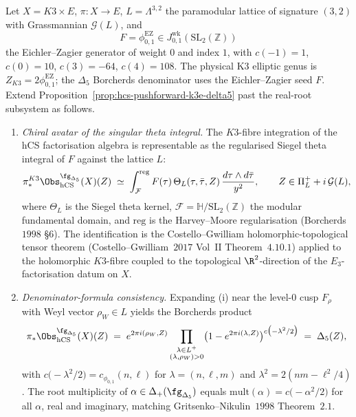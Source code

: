 \begin{theorem}
\label{thm:hcs-pushforward-imaginary-roots-singular-theta}
Let $X = K3 \times E$, $\pi \colon X \to E$, \(L=\Lambda^{3,2}\) the
paramodular lattice of signature \((3,2)\) with Grassmannian
\(\mathcal G(L)\), and
\[
F=\phi_{0,1}^{\mathrm{EZ}}\in
J_{0,1}^{\mathrm{wk}}(\mathrm{SL}_2(\mathbb Z))
\]
the Eichler--Zagier generator of weight \(0\) and index \(1\), with
\(c(-1)=1\), \(c(0)=10\), \(c(3)=-64\), \(c(4)=108\). The physical K3
elliptic genus is \(Z_{K3}=2\phi_{0,1}^{\mathrm{EZ}}\); the
\(\Delta_5\) Borcherds denominator uses the Eichler--Zagier seed \(F\).
Extend
Proposition~\ref{prop:hcs-pushforward-k3e-delta5} past the real-root
subsystem as follows.
\begin{enumerate}[label=\textup{(\roman*)}]
 \item \emph{Chiral avatar of the singular theta integral.} The $K3$-fibre integration of the hCS factorisation algebra is representable as the regularised Siegel theta integral of $F$ against the lattice $L$:
 \[
 \pi_*^{K3} \Obs_{\hCS}^{\fg_{\Delta_5}}(X)(Z) \;\simeq\; \int_{\mathcal{F}}^{\mathrm{reg}} F(\tau) \, \Theta_L(\tau, \bar\tau, Z) \, \frac{d\tau \wedge d\bar\tau}{y^2}, \qquad Z \in \Pi^+_L + i\,\mathcal{G}(L),
 \]
 where $\Theta_L$ is the Siegel theta kernel, $\mathcal{F} = \mathbb{H} / \mathrm{SL}_2(\mathbb{Z})$ the modular fundamental domain, and $\mathrm{reg}$ is the Harvey--Moore regularisation (Borcherds~$1998$ \S6). The identification is the Costello--Gwilliam holomorphic-topological tensor theorem (Costello--Gwilliam~$2017$ Vol~II Theorem~$4.10.1$) applied to the holomorphic $K3$-fibre coupled to the topological $\R^2$-direction of the $E_3$-factorisation datum on $X$.
 \item \emph{Denominator-formula consistency.} Expanding \textup{(i)} near the level-$0$ cusp $F_\rho$ with Weyl vector $\rho_W \in L$ yields the Borcherds product
 \[
 \pi_* \Obs_{\hCS}^{\fg_{\Delta_5}}(X)(Z) \;=\; e^{2\pi i (\rho_W, Z)} \prod_{\substack{\lambda \in L^+ \\ (\lambda, \rho_W) > 0}} \bigl(1 - e^{2\pi i (\lambda, Z)}\bigr)^{c\bigl(-\lambda^2/2\bigr)} \;=\; \Delta_5(Z),
 \]
 with $c\bigl(-\lambda^2/2\bigr) = c_{\phi_{0,1}}(n, \ell)$ for $\lambda = (n, \ell, m)$ and $\lambda^2 = 2(nm - \ell^2/4)$. The root multiplicity of $\alpha \in \Delta_+(\fg_{\Delta_5})$ equals $\mathrm{mult}(\alpha) = c\bigl(-\alpha^2/2\bigr)$ for all $\alpha$, real and imaginary, matching Gritsenko--Nikulin~$1998$ Theorem~$2.1$.

\end{enumerate}
\end{theorem}
